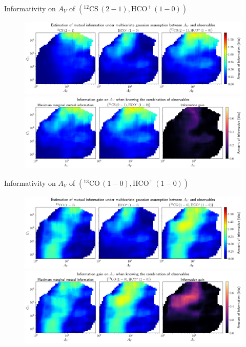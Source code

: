 \documentclass{beamer}
\begin{document}
\begin{frame}{Informativity on $A_V$ of $\left(\mathrm{^{12}CS\,(2-1)},\mathrm{HCO^+\,(1-0)}\right)$}
    \begin{figure}
        \centering
        \includegraphics[width=0.95\linewidth]{../linearinfogauss/av__12cs21_hcop10_linearinfogauss.png}
        \vfill
        \includegraphics[width=0.95\linewidth]{../linearinfogauss/av__12cs21_hcop10_linearinfogauss_gain.png}
    \end{figure}
\end{frame}

\begin{frame}{Informativity on $A_V$ of $\left(\mathrm{^{13}CO\,(1-0)},\mathrm{HCO^+\,(1-0)}\right)$}
    \begin{figure}
        \centering
        \includegraphics[width=0.95\linewidth]{../linearinfogauss/av__13co10_hcop10_linearinfogauss.png}
        \vfill
        \includegraphics[width=0.95\linewidth]{../linearinfogauss/av__13co10_hcop10_linearinfogauss_gain.png}
    \end{figure}
\end{frame}
\end{document}
